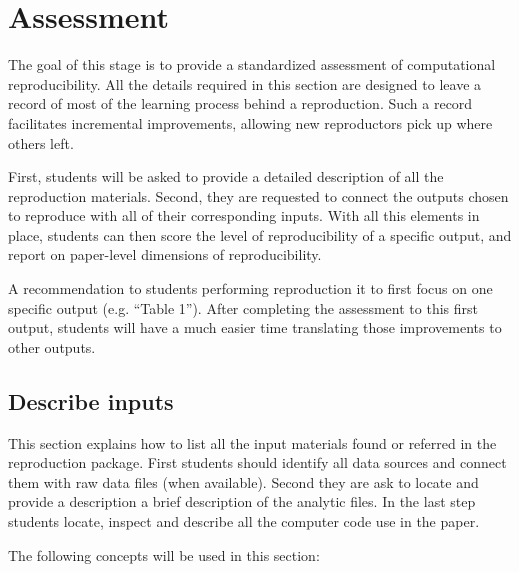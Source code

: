 \documentclass[]{book}
\begin{document}
\hypertarget{assessment}{%
\chapter{Assessment}\label{assessment}}

The goal of this stage is to provide a standardized assessment of computational reproducibility. All the details required in this section are designed to leave a record of most of the learning process behind a reproduction. Such a record facilitates incremental improvements, allowing new reproductors pick up where others left.

First, students will be asked to provide a detailed description of all the reproduction materials. Second, they are requested to connect the outputs chosen to reproduce with all of their corresponding inputs. With all this elements in place, students can then score the level of reproducibility of a specific output, and report on paper-level dimensions of reproducibility.

A recommendation to students performing reproduction it to first focus on one specific output (e.g. ``Table 1''). After completing the assessment to this first output, students will have a much easier time translating those improvements to other outputs.

\hypertarget{describe-inputs}{%
\section{Describe inputs}\label{describe-inputs}}

This section explains how to list all the input materials found or referred in the reproduction package. First students should identify all data sources and connect them with raw data files (when available). Second they are ask to locate and provide a description a brief description of the analytic files. In the last step students locate, inspect and describe all the computer code use in the paper.

The following concepts will be used in this section:
\end{document}

